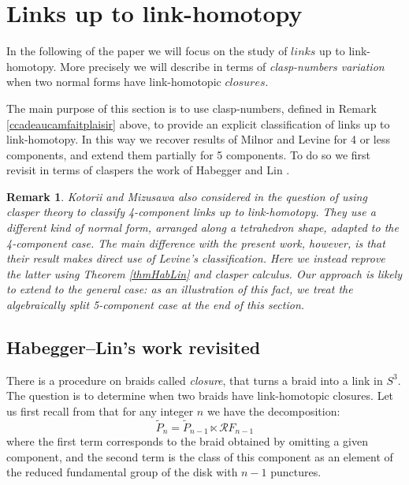 \documentclass[11pt, a4paper, twoside,reqno]{amsart}
\newtheorem{rmq}[thm]{Remark}
\begin{document}
\section{Links up to link-homotopy}\label{sectionlinks}

In the following of the paper we will focus on the study of $links$ up to link-homotopy. More precisely we will describe in terms of \emph{clasp-numbers variation} when two normal forms have link-homotopic $closures$.

The main purpose of this section is to use clasp-numbers, defined in Remark \ref{ccadeaucamfaitplaisir} above, to provide an explicit classification of links up to link-homotopy. In this way we recover results of Milnor \cite{MilnorLinkgrp} and Levine \cite{Levine4comp} for 4 or less components, and extend them partially for 5 components. To do so we first revisit in terms of claspers the work of Habegger and Lin \cite{HabeggerLinHomotopy}.
\begin{rmq}
Kotorii and Mizusawa also considered in \cite{kotorii_link-homotopy_2020} the question of using clasper theory to classify  4-component links up to link-homotopy. They use a different kind of normal form, arranged along a tetrahedron shape, adapted to the 4-component case. The main difference with the present work, however, is that their result makes direct use of Levine's classification. Here we instead reprove the latter using Theorem \ref{thmHabLin} and
clasper calculus. Our approach is likely to extend to the general case: as an illustration of this fact, we treat the algebraically split 5-component case at the end of this section.
\end{rmq}

\subsection{Habegger--Lin's work revisited}

There is a procedure on braids called \emph{closure}, that turns a braid into a link in $S^3$. The question is to determine when two braids have link-homotopic closures. Let us  first recall from \cite[Theorem 1.7 $\&$ Corollary 1.11]{HabeggerLinHomotopy} that for any integer $n$ we have the decomposition: $$\tilde P_n=\tilde P_{n-1}\ltimes\mathcal RF_{n-1}$$ where the first term corresponds to the braid obtained by omitting a given component, and the second term is the class of this component as an element of the reduced fundamental group of the disk with $n-1$ punctures.
\end{document}
